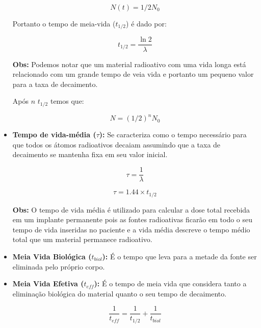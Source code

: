 \documentclass[11pt,a4paper]{article}
\begin{document}
\begin{itemize}
				\begin{equation}
					N(t) = {1/2}N_0
				\end{equation}

				Portanto o tempo de meia-vida  ($t_{1/2}$) é dado por:

				\begin{equation}
					t_{1/2} = \frac{\ln 2}{\lambda}
				\end{equation}

				\textbf{\textcolor{CarnationPink}{Obs:} } Podemos notar que um material radioativo com uma vida longa está relacionado com um grande tempo de veia vida e portanto um pequeno valor para a taxa de decaimento.

				Após $n$ $t_{1/2}$ temos que:

				\begin{equation}
					N = \left({1/2}\right)^n N_0
				\end{equation}



			\item \textbf{Tempo de vida-média ($\tau$): } Se caracteriza como o tempo necessário para que todos os átomos radioativos decaiam assumindo que a taxa de decaimento se mantenha fixa em seu valor inicial.
			
				\begin{equation}
					\tau = \frac{1}{\lambda}
				\end{equation}

				\begin{equation}
					\tau = 1.44 \times t_{1/2}
				\end{equation}

				\textbf{\textcolor{CarnationPink}{Obs:} } O tempo de vida média é utilizado para calcular a dose total recebida em um implante permanente pois as fontes radioativas ficarão em todo o seu tempo de vida inseridas no paciente e a vida média descreve o tempo médio total que um material permanece radioativo.

			\item \textbf{Meia Vida Biológica ($t_{biol}$): } É o tempo que leva para a metade da fonte ser eliminada pelo próprio corpo.
			
			\item \textbf{Meia Vida Efetiva ($t_{eff}$): } É o tempo de meia vida que considera tanto a eliminação biológica do material quanto o seu tempo de decaimento.
			
				\begin{equation}
					\frac{1}{t_{eff}} = \frac{1}{t_{1/2}} + \frac{1}{t_{biol}}
				\end{equation}


\end{itemize}
\end{document}
